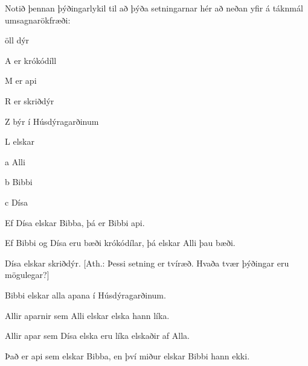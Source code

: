 \practiceproblems
\problempart
Notið þennan þýðingarlykil til að þýða setningarnar hér að neðan yfir á táknmál umsagnarökfræði:
\begin{ekey}
\item[\text{yfirgrip}] öll dýr
\item[A]  er krókódíll
\item[M]  er api
\item[R]  er skriðdýr
\item[Z]  býr í Húsdýragarðinum
\item[L]  elskar 
\item[a] Alli
\item[b] Bibbi
\item[c] Dísa
\end{ekey}

\begin{earg}
\item Ef Dísa elskar Bibba, þá er Bibbi api. 
\item Ef Bibbi og Dísa eru bæði krókódílar, þá elskar Alli þau bæði.
\item Dísa elskar skriðdýr. [Ath.: Þessi setning er tvíræð. Hvaða tvær þýðingar eru mögulegar?]
\item Bibbi elskar alla apana í Húsdýragarðinum.
\item Allir aparnir sem Alli elskar elska hann líka.
\item Allir apar sem Dísa elska eru líka elskaðir af Alla.
\item Það er api sem elskar Bibba, en því miður elskar Bibbi hann ekki.
\end{earg}

